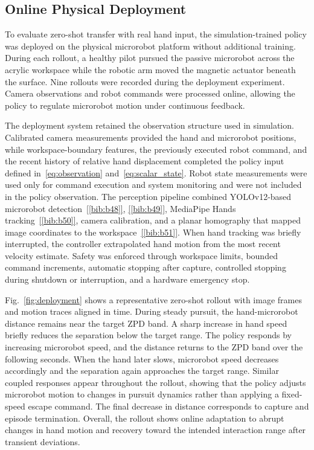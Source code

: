 \documentclass[journal,twoside,web]{ieeecolor2}
\newcommand{\citelink}[1]{\hyperref[bib:#1]{[\ref*{bib:#1}]}}
\begin{document}
\subsection{Online Physical Deployment}
To evaluate zero-shot transfer with real hand input, the simulation-trained policy was deployed on the physical microrobot platform without additional training. During each rollout, a healthy pilot pursued the passive microrobot across the acrylic workspace while the robotic arm moved the magnetic actuator beneath the surface. Nine rollouts were recorded during the deployment experiment. Camera observations and robot commands were processed online, allowing the policy to regulate microrobot motion under continuous feedback.

The deployment system retained the observation structure used in simulation. Calibrated camera measurements provided the hand and microrobot positions, while workspace-boundary features, the previously executed robot command, and the recent history of relative hand displacement completed the policy input defined in~\eqref{eq:observation} and~\eqref{eq:scalar_state}. Robot state measurements were used only for command execution and system monitoring and were not included in the policy observation. The perception pipeline combined YOLOv12-based microrobot detection~\citelink{b48}, \citelink{b49}, MediaPipe Hands tracking~\citelink{b50}, camera calibration, and a planar homography that mapped image coordinates to the workspace~\citelink{b51}. When hand tracking was briefly interrupted, the controller extrapolated hand motion from the most recent velocity estimate. Safety was enforced through workspace limits, bounded command increments, automatic stopping after capture, controlled stopping during shutdown or interruption, and a hardware emergency stop.

Fig.~\ref{fig:deployment} shows a representative zero-shot rollout with image frames and motion traces aligned in time. During steady pursuit, the hand-microrobot distance remains near the target ZPD band. A sharp increase in hand speed briefly reduces the separation below the target range. The policy responds by increasing microrobot speed, and the distance returns to the ZPD band over the following seconds. When the hand later slows, microrobot speed decreases accordingly and the separation again approaches the target range. Similar coupled responses appear throughout the rollout, showing that the policy adjusts microrobot motion to changes in pursuit dynamics rather than applying a fixed-speed escape command. The final decrease in distance corresponds to capture and episode termination. Overall, the rollout shows online adaptation to abrupt changes in hand motion and recovery toward the intended interaction range after transient deviations.
\end{document}
